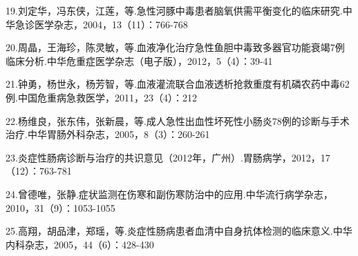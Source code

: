 19.刘定华，冯东侠，江莲，等.急性河豚中毒患者脑氧供需平衡变化的临床研究.中华急诊医学杂志，2004，13（11）：766-768

20.周晶，王海珍，陈灵敏，等.血液净化治疗急性鱼胆中毒致多器官功能衰竭7例临床分析.中华危重症医学杂志（电子版），2012，5（4）：39-41

21.钟勇，杨世永，杨芳智，等.血液灌流联合血液透析抢救重度有机磷农药中毒62例.中国危重病急救医学，2011，23（4）：212

22.杨维良，张东伟，张新晨，等.成人急性出血性坏死性小肠炎78例的诊断与手术治疗.中华胃肠外科杂志，2005，8（3）：260-261

23.炎症性肠病诊断与治疗的共识意见（2012年，广州）.胃肠病学，2012，17（12）：763-781

24.曾德唯，张静.症状监测在伤寒和副伤寒防治中的应用.中华流行病学杂志，2010，31（9）：1053-1055

25.高翔，胡品津，郑瑶，等.炎症性肠病患者血清中自身抗体检测的临床意义.中华内科杂志，2005，44（6）：428-430

\protect\hypertarget{text00189.html}{}{}

